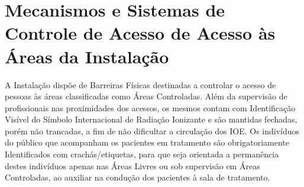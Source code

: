 \chapter{Mecanismos e Sistemas de Controle de Acesso de Acesso às Áreas da Instalação}
A Instalação dispõe de Barreiras Físicas destinadas a controlar o acesso de pessoas às áreas classificadas como Áreas Controladas. Além da supervisão de profissionais nas proximidades dos acessos, os mesmos contam com Identificação Visível do Símbolo Internacional de Radiação Ionizante e são mantidas fechadas, porém não trancadas, a fim de não dificultar a circulação dos IOE. Os indivíduos do público que acompanham os pacientes em tratamento são obrigatoriamente Identificados com crachás/etiquetas, para que seja orientada a permanência destes indivíduos apenas nas Áreas Livres ou sob supervisão em Áreas Controladas, ao auxiliar na condução dos pacientes à sala de tratamento.